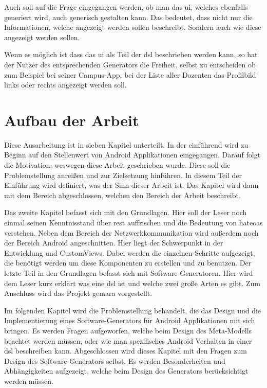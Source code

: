 Auch soll auf die Frage eingegangen werden, ob man das \ac{ui}, welches ebenfalls generiert wird, auch generisch gestalten kann. Das bedeutet, dass nicht nur die Informationen, welche angezeigt werden sollen beschreibt. Sondern auch wie diese angezeigt werden sollen.

Wenn es möglich ist dass das \ac{ui} als Teil der \acf{dsl} beschrieben werden kann, so hat der Nutzer des entsprechenden Generators die Freiheit, selbst zu entscheiden ob zum Beispiel bei seiner Campus-App, bei der Liste aller Dozenten das Profilbild links oder rechts angezeigt werden soll.

\section{Aufbau der Arbeit}\label{sec:structure}
Diese Ausarbeitung ist in sieben Kapitel unterteilt. In der einführend wird zu Beginn auf den Stellenwert von Android Applikationen eingegangen. Darauf folgt die Motivation, weswegen diese Arbeit geschrieben wurde. Diese soll die Problemstellung anreißen und zur Zielsetzung hinführen. In diesem Teil der Einführung wird definiert, was der Sinn dieser Arbeit ist. Das Kapitel wird dann mit dem Bereich abgeschlossen, welchen den Bereich der Arbeit beschreibt.

Das zweite Kapitel befasst sich mit den Grundlagen. Hier soll der Leser noch einmal seinen Kenntnisstand über \acf{rest} auffrischen und die Bedeutung von \acf{hateoas} verstehen. Neben dem Bereich der Netzwerkkommunikation wird außerdem noch der Bereich Android angeschnitten. Hier liegt der Schwerpunkt in der Entwicklung und CustomViews. Dabei werden die einzelnen Schritte aufgezeigt, die benötigt werden um diese Komponenten zu erstellen und zu benutzen. Der letzte Teil in den Grundlagen befasst sich mit Software-Generatoren. Hier wird dem Leser kurz erklärt was eine \acf{dsl} ist und welche zwei große Arten es gibt.
Zum Anschluss wird das Projekt \acf{gemara} vorgestellt. 

Im folgenden Kapitel wird die Problemstellung behandelt, die das Design und die Implementierung eines Software-Generators für Android Applikationen mit sich bringen. Es werden Fragen aufgeworfen, welche beim Design des Meta-Modells beachtet werden müssen, oder wie man spezifisches Android Verhalten in einer \ac{dsl} beschreiben kann. Abgeschlossen wird dieses Kapitel mit den Fragen zum Design des Software-Generators selbst. Es werden Besonderheiten und Abhängigkeiten aufgezeigt, welche beim Design des Generators berücksichtigt werden müssen.

